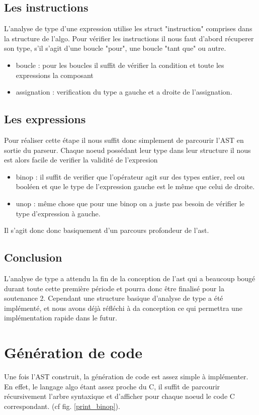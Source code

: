 \documentclass[12pt,a4paper]{report}
\begin{document}
\subsection{Les instructions}
L'analyse de type d'une expression utilise les struct "instruction" comprises dans la structure de l'algo. 
Pour vérifier les instructions il nous faut d'abord récuperer son type, s'il s'agit d'une boucle "pour", une boucle "tant que" ou autre.
\begin{itemize}
\item boucle : pour les boucles il suffit de vérifier la condition et toute les expressions la composant
\item assignation : verification du type a gauche et a droite de l'assignation.
\end{itemize}

\subsection{Les expressions}
Pour réaliser cette étape il nous suffit donc simplement de parcourir l'AST en sortie du parseur. Chaque noeud possédant leur type dans leur structure il nous est alors facile de verifier la validité de l'expresion
\begin{itemize}
\item binop : il suffit de verifier que l'opérateur agit sur des types entier, reel ou booléen et que le type de l'expression gauche est le même que celui de droite.
\item unop :  même chose que pour une binop on a juste pas besoin de vérifier le type d'expression à gauche. 
\end{itemize}
Il s'agit donc donc basiquement d'un parcours profondeur de l'ast.
\subsection{Conclusion}
L'analyse de type a attendu la fin de la conception de l'ast qui a beaucoup bougé durant toute cette première période et pourra donc être finalisé pour la soutenance 2. Cependant une structure basique d'analyse de type a été implémenté, et nous avons déjà réfléchi à da conception ce qui permettra une implémentation rapide dans le futur.
\newpage

\section{Génération de code}
Une fois l'AST construit, la génération de code est assez simple à implémenter. En effet, le langage algo étant assez proche du C, il suffit de parcourir récursivement l'arbre syntaxique et d'afficher pour chaque noeud le code C correspondant. (cf fig. \ref{print_binop}). \\
\end{document}
